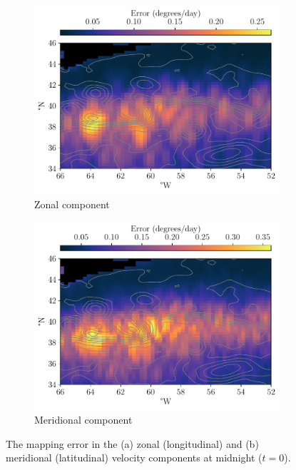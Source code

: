 \begin{figure}
	\centering
	\begin{subfigure}{0.49\textwidth}
		\includegraphics[width=\textwidth]{chp06_applications/figures/gulf_stream/u_err_0}
		\caption{Zonal component}
	\end{subfigure}
	\begin{subfigure}{0.49\textwidth}
		\includegraphics[width=\textwidth]{chp06_applications/figures/gulf_stream/v_err_0}
		\caption{Meridional component}
	\end{subfigure}
	\caption{The mapping error in the (a) zonal (longitudinal) and (b) meridional (latitudinal) velocity components at midnight  (\(t = 0\)).}
	\label{fig:natl_err}
\end{figure}

